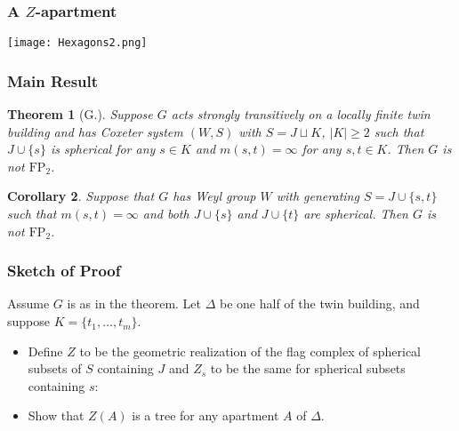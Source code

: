 \documentclass[xcolor=dvipsnames]{beamer}
\newcommand{\FP}{\mathrm{FP}}
\newtheorem{Theo}{Theorem}
\newtheorem{Cor}[Theo]{Corollary}
\theoremstyle{definition}
\begin{document}
\begin{frame}
\frametitle{A $Z$-apartment}
\begin{center}
\texttt{[image: Hexagons2.png]}
\end{center}
\end{frame}


\begin{frame}
\frametitle{Main Result}

\begin{Theo}[G.]
Suppose $G$ acts strongly transitively on a locally finite twin building and has Coxeter system $(W,S)$ with $S = J\sqcup K$, $|K|\geq 2$ such that $J\cup \{s\}$ is spherical for any $s\in K$ and $m(s,t) = \infty$ for any $s,t\in K$. Then $G$ is not $\FP_2$.
\end{Theo}


\begin{Cor}
Suppose that $G$ has Weyl group $W$ with generating $S = J\cup\{s,t\}$ such that $m(s,t) = \infty$ and both $J\cup\{s\}$ and $J\cup\{t\}$ are spherical. Then $G$ is not $\FP_2$.
\end{Cor}

\end{frame}

\begin{frame}
\frametitle{Sketch of Proof}
Assume $G$ is as in the theorem. Let $\Delta$ be one half of the twin building, and suppose $K= \{t_1,\ldots, t_m\}$.
\begin{itemize}
\item Define $Z$ to be the geometric realization of the flag complex of spherical subsets of $S$ containing $J$ and $Z_s$ to be the same for spherical subsets containing $s$:
\begin{center}
\end{center}
\item Show that $Z(A)$ is a tree for any apartment $A$ of $\Delta$.

\end{itemize}
\end{frame}
\end{document}
